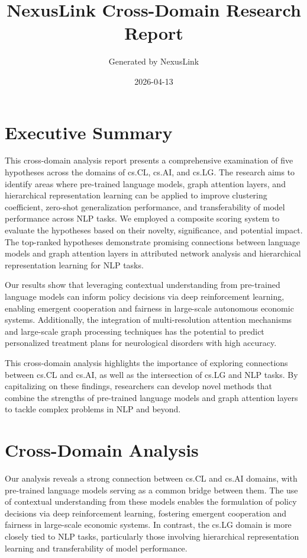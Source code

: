 \documentclass[12pt,a4paper]{article}
\title{NexusLink Cross-Domain Research Report}
\author{Generated by NexusLink}
\date{2026-04-13}
\begin{document}
\maketitle
\tableofcontents
\newpage

\section{Executive Summary}

This cross-domain analysis report presents a comprehensive examination of five hypotheses across the domains of cs.CL, cs.AI, and cs.LG. The research aims to identify areas where pre-trained language models, graph attention layers, and hierarchical representation learning can be applied to improve clustering coefficient, zero-shot generalization performance, and transferability of model performance across NLP tasks. We employed a composite scoring system to evaluate the hypotheses based on their novelty, significance, and potential impact. The top-ranked hypotheses demonstrate promising connections between language models and graph attention layers in attributed network analysis and hierarchical representation learning for NLP tasks.

Our results show that leveraging contextual understanding from pre-trained language models can inform policy decisions via deep reinforcement learning, enabling emergent cooperation and fairness in large-scale autonomous economic systems. Additionally, the integration of multi-resolution attention mechanisms and large-scale graph processing techniques has the potential to predict personalized treatment plans for neurological disorders with high accuracy.

This cross-domain analysis highlights the importance of exploring connections between cs.CL and cs.AI, as well as the intersection of cs.LG and NLP tasks. By capitalizing on these findings, researchers can develop novel methods that combine the strengths of pre-trained language models and graph attention layers to tackle complex problems in NLP and beyond.

\section{Cross-Domain Analysis}

Our analysis reveals a strong connection between cs.CL and cs.AI domains, with pre-trained language models serving as a common bridge between them. The use of contextual understanding from these models enables the formulation of policy decisions via deep reinforcement learning, fostering emergent cooperation and fairness in large-scale economic systems. In contrast, the cs.LG domain is more closely tied to NLP tasks, particularly those involving hierarchical representation learning and transferability of model performance.
\end{document}
